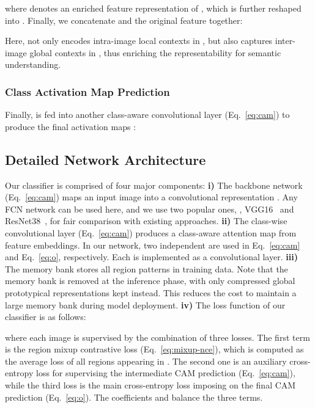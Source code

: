 \documentclass[10pt,twocolumn,letterpaper]{article}
\begin{document}
where  denotes an enriched feature representation of , which is further reshaped into . Finally, we concatenate   and the original feature  together:
\vspace{-3pt}

Here,   not only encodes intra-image local contexts in , but also captures inter-image global  contexts  in , thus enriching the representability for semantic understanding. 

\subsubsection{Class Activation Map Prediction}
Finally,  is fed into another class-aware convolutional layer   (Eq.~\ref{eq:cam}) to produce the final activation maps :
\vspace{-3pt}




\subsection{Detailed Network Architecture}\label{sec:arch}

Our classifier is comprised of four major components: \textbf{i)} The {backbone network}  (Eq.~\ref{eq:cam}) maps an input image  into a convolutional representation . Any FCN network can be used here, and we use two popular ones,  \ie, VGG16~\cite{simonyan2014very} and ResNet38~\cite{he2016deep}, for fair comparison with existing approaches. \textbf{ii)} The {class-wise convolutional layer}  (Eq.~\ref{eq:cam})  produces a class-aware attention map from feature embeddings. In our network, two independent  are used in Eq.~\ref{eq:cam} and Eq.~\ref{eq:o}, respectively. Each  is implemented as a  convolutional layer. \textbf{iii)} The {memory bank}   stores all region patterns in training data. Note that the memory bank is  removed at the inference phase, with only compressed global prototypical representations kept instead. This reduces the cost to maintain a large memory bank  during model deployment. \textbf{iv)} The loss function of our classifier is as follows:
	\vspace{-3pt}
	
	where each image  is supervised by the combination of three losses. The first term  is the region mixup contrastive loss (Eq.~\ref{eq:mixup-nce}), which is computed as the average loss of all regions appearing in . The second one is {an auxiliary cross-entropy loss}  for supervising the intermediate CAM prediction  (Eq.~\ref{eq:cam}), while the third loss is the main cross-entropy loss  imposing on the final CAM prediction  (Eq.~\ref{eq:o}).  The coefficients  and  balance the three  terms.
	
\end{document}

